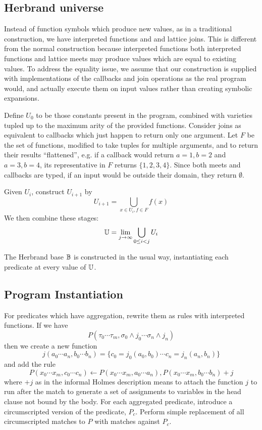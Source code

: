 \subsection{Herbrand universe}
\label{formal:sec:callbacks}
Instead of function symbols which produce new values, as in a traditional construction, we have interpreted functions and and lattice joins.
This is different from the normal construction because interpreted functions both interpreted functions and lattice meets may produce values which are equal to existing values.
To address the equality issue, we assume that our construction is supplied with implementations of the callbacks and join operations as the real program would, and actually execute them on input values rather than creating symbolic expansions.

Define $U_0$ to be those constants present in the program, combined with varieties tupled up to the maximum arity of the provided functions.
Consider joins as equivalent to callbacks which just happen to return only one argument.
Let $F$ be the set of functions, modified to take tuples for multiple arguments, and to return their results ``flattened'', e.g. if a callback would return $a = 1, b = 2$ and $a = 3, b = 4$, its representative in $F$ returns $\{1, 2, 3, 4\}$.
Since both meets and callbacks are typed, if an input would be outside their domain, they return $\emptyset$.

Given $U_i$, construct $U_{i + 1}$ by
\[
	U_{i + 1} = \bigcup_{x \in U_i, f \in F} f(x)
\]
We then combine these stages:
\[
	\mathbb{U} = \lim_{j \rightarrow \infty} \bigcup_{0 \leq i < j} U_i
\]

The Herbrand base $\mathbb{B}$ is constructed in the usual way, instantiating each predicate at every value of $\mathbb{U}$.

\subsection{Program Instantiation}
For predicates which have aggregation, rewrite them as rules with interpreted functions.
If we have
\[
	P(\tau_0 \cdots \tau_m, \sigma_0\wedge j_0 \cdots \sigma_n \wedge j_n)
\]
then we create a new function
\[
	j(a_0 \cdots a_n, b_0 \cdots b_n) = \{c_0 = j_0(a_0, b_0) \cdots c_n = j_n(a_n, b_n)\}
\]
and add the rule
\[
	P(x_0 \cdots x_m, c_0 \cdots c_n) \leftarrow P(x_0 \cdots x_m, a_0 \cdots a_n), P(x_0 \cdots x_m, b_0 \cdots b_n) + j
\]
where $+ j$ as in the informal Holmes description means to attach the function $j$ to run after the match to generate a set of assignments to variables in the head clause not bound by the body.
For each aggregated predicate, introduce a circumscripted version of the predicate, $P_c$.
Perform simple replacement of all circumscripted matches to $P$ with matches against $P_c$.

